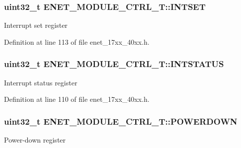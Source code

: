 \subsubsection[{\texorpdfstring{I\+N\+T\+S\+ET}{INTSET}}]{ uint32\+\_\+t E\+N\+E\+T\+\_\+\+M\+O\+D\+U\+L\+E\+\_\+\+C\+T\+R\+L\+\_\+\+T\+::\+I\+N\+T\+S\+ET}\hypertarget{structENET__MODULE__CTRL__T_a7898d6a89c630ecd471a7a059ee376d6}{}\label{structENET__MODULE__CTRL__T_a7898d6a89c630ecd471a7a059ee376d6}
Interrupt set register 

Definition at line 113 of file enet\+\_\+17xx\+\_\+40xx.\+h.

\subsubsection[{\texorpdfstring{I\+N\+T\+S\+T\+A\+T\+US}{INTSTATUS}}]{ uint32\+\_\+t E\+N\+E\+T\+\_\+\+M\+O\+D\+U\+L\+E\+\_\+\+C\+T\+R\+L\+\_\+\+T\+::\+I\+N\+T\+S\+T\+A\+T\+US}\hypertarget{structENET__MODULE__CTRL__T_a7dac73c2fd05c5247f006717dbe6c9fa}{}\label{structENET__MODULE__CTRL__T_a7dac73c2fd05c5247f006717dbe6c9fa}
Interrupt status register 

Definition at line 110 of file enet\+\_\+17xx\+\_\+40xx.\+h.

\subsubsection[{\texorpdfstring{P\+O\+W\+E\+R\+D\+O\+WN}{POWERDOWN}}]{ uint32\+\_\+t E\+N\+E\+T\+\_\+\+M\+O\+D\+U\+L\+E\+\_\+\+C\+T\+R\+L\+\_\+\+T\+::\+P\+O\+W\+E\+R\+D\+O\+WN}\hypertarget{structENET__MODULE__CTRL__T_a42b5ebd11c8549b2ba2bb072b5b42736}{}\label{structENET__MODULE__CTRL__T_a42b5ebd11c8549b2ba2bb072b5b42736}
Power-\/down register 


